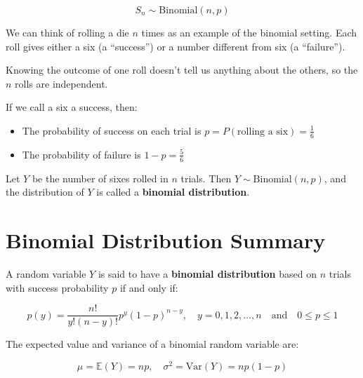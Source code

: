 \[
S_n \sim \text{Binomial}(n, p)
\]
\medskip
\begin{tcolorbox}[title=Example: Binomial Distribution from Die Rolls,
  colback=blue!5, colframe=blue!40!black, coltitle=black,
  colbacktitle=blue!10!white, fonttitle=\bfseries, breakable]

We can think of rolling a die \( n \) times as an example of the binomial setting. Each roll gives either a six (a “success”) or a number different from six (a “failure”).

Knowing the outcome of one roll doesn’t tell us anything about the others, so the \( n \) rolls are independent.

If we call a six a success, then:
\begin{itemize}
  \item The probability of success on each trial is \( p = P(\text{rolling a six}) = \frac{1}{6} \)
  \item The probability of failure is \( 1 - p = \frac{5}{6} \)
\end{itemize}

Let \( Y \) be the number of sixes rolled in \( n \) trials. Then \( Y \sim \text{Binomial}(n, p) \), and the distribution of \( Y \) is called a \textbf{binomial distribution}.
\end{tcolorbox}


\section{Binomial Distribution Summary} %

A random variable \( Y \) is said to have a \textbf{binomial distribution} based on \( n \) trials with success probability \( p \) if and only if:

\[
p(y) = \frac{n!}{y!(n - y)!} p^y (1 - p)^{n - y}, \quad y = 0, 1, 2, \dots, n \quad \text{and} \quad 0 \leq p \leq 1
\]

\medskip

The expected value and variance of a binomial random variable are:

\[
\mu = \mathbb{E}(Y) = np, \quad \sigma^2 = \mathrm{Var}(Y) = np(1 - p)
\]





